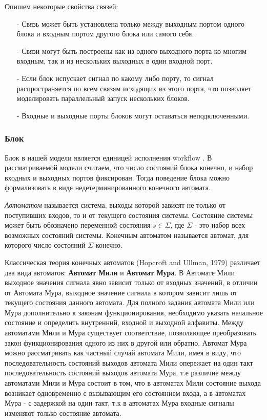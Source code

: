 \documentclass[a4paper,12pt]{article}
\begin{document}
Опишем некоторые свойства связей:
\begin{enumerate}
\item[-] Связь может быть установлена только между выходным портом одного блока и входным портом другого блока или самого себя.
\item[-] Связи могут быть построены как из одного выходного порта ко многим входным, так и из нескольких выходных в один входной порт.
\item[-] Если блок испускает сигнал по какому либо порту, то сигнал распространяется по всем связям исходящих из этого порта, что позволяет моделировать параллельный запуск нескольких блоков.
\item[-] Входные и выходные порты блоков могут оставаться неподключенными.
\end{enumerate}
 
\subsubsection{Блок}
Блок в нашей модели является единицей исполнения workflow . В рассматриваемой модели считаем, что число состояний блока конечно, и набор входных и выходных портов фиксирован. Тогда поведение блока можно формализовать в виде недетерминированного конечного автомата.

\textit{Автоматом} называется система, выходы которой зависят не только от поступивших входов, то и от текущего состояния системы.
Состояние системы может быть обозначено переменной состояния $s \in \Sigma$, где $\Sigma$  - это набор всех возможных состояний системы. Конечным автоматом называется автомат, для которого число состояний $\Sigma$ конечно.

Классическая теория конечных автоматов  (Hopcroft and Ullman, 1979) различает два вида автоматов: \textbf{Автомат Мили} и \textbf{Автомат Мура}. В Автомате Мили выходное значения сигнала явно зависит только от входных значений, в отличии от Автомата Мура, выходное значение сигнала в котором зависит лишь от текущего состояния данного автомата. Для полного задания автомата Мили или  Мура  дополнительно к законам функционирования, необходимо указать начальное состояние и определить внутренний, входной и выходной алфавиты. Между автоматами Мили и Мура существует соответствие, позволяющее преобразовать закон функционирования одного из них в другой или обратно. Автомат Мура можно рассматривать как частный случай автомата Мили, имея в виду, что последовательность состояний выходов автомата Мили опережает на один такт последовательность состояний выходов автомата Мура, т.е различие между автоматами Мили и Мура состоит в том, что в автоматах Мили состояние выхода возникает одновременно с вызывающим его состоянием входа, а в автоматах Мура - с задержкой на один такт, т.к в автоматах Мура входные сигналы изменяют только состояние автомата.\\
\end{document}
